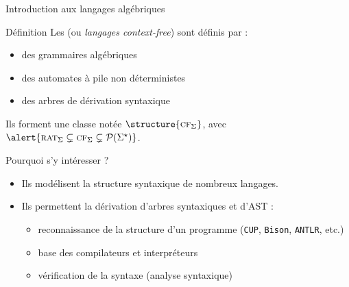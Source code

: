 
\begingroup

\begin{frame}{Introduction aux langages algébriques}
  \begin{block}{Définition}
    Les  (ou \emph{langages context-free}) sont définis par :
    \begin{itemize}
      \item des grammaires algébriques
      \item des automates à pile non déterministes
      \item des arbres de dérivation syntaxique
    \end{itemize}
    Ils forment une classe notée $\structure{\textsc{cf}_\Sigma}$, avec $\alert{\textsc{rat}_\Sigma \subsetneq \textsc{cf}_\Sigma \subsetneq \mathcal{P}(\Sigma^\star)}$.
  \end{block}

  \begin{block}{Pourquoi s'y intéresser ?}
    \begin{itemize}
      \item Ils modélisent la structure syntaxique de nombreux langages.
      \item Ils permettent la dérivation d’arbres syntaxiques et d'AST :
        \begin{itemize}
          \item reconnaissance de la structure d’un programme (\texttt{CUP}, \texttt{Bison}, \texttt{ANTLR}, etc.)
          \item base des compilateurs et interpréteurs
          \item vérification de la syntaxe (analyse syntaxique)
        \end{itemize}
    \end{itemize}
  \end{block}
\end{frame}

\endgroup

